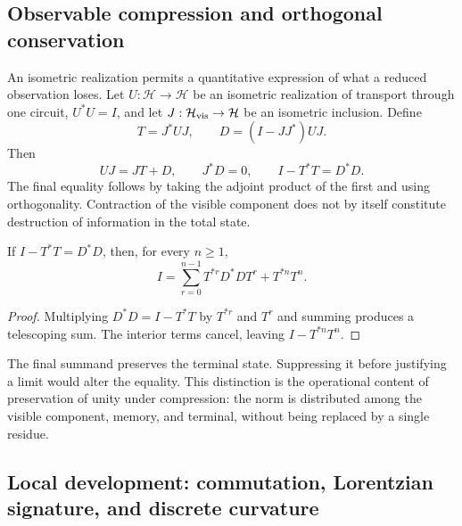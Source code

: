 \subsection{Observable compression and orthogonal conservation}

An isometric realization permits a quantitative expression of what a reduced observation loses. Let \(U:\mathcal H\to\mathcal H\) be an isometric realization of transport through one circuit, \(U^*U=I\), and let \(J:\mathcal H_{\rm vis}\to\mathcal H\) be an isometric inclusion. Define
\[
 T=J^*UJ,\qquad D=(I-JJ^*)UJ.
\]
Then
\begin{equation}
 UJ=JT+D,\qquad J^*D=0,\qquad I-T^*T=D^*D.
 \label{eq:conservacion-ortogonal}
\end{equation}
The final equality follows by taking the adjoint product of the first and using orthogonality. Contraction of the visible component does not by itself constitute destruction of information in the total state.

\begin{proposition}
If \(I-T^*T=D^*D\), then, for every \(n\ge1\),
\begin{equation}
 I=\sum_{r=0}^{n-1}T^{*r}D^*DT^r+T^{*n}T^n.
 \label{eq:telescopia}
\end{equation}
\end{proposition}
\begin{proof}
Multiplying \(D^*D=I-T^*T\) by \(T^{*r}\) and \(T^r\) and summing produces a telescoping sum. The interior terms cancel, leaving \(I-T^{*n}T^n\).
\end{proof}

The final summand preserves the terminal state. Suppressing it before justifying a limit would alter the equality. This distinction is the operational content of preservation of unity under compression: the norm is distributed among the visible component, memory, and terminal, without being replaced by a single residue.

\subsection{Local development: commutation, Lorentzian signature, and discrete curvature}

